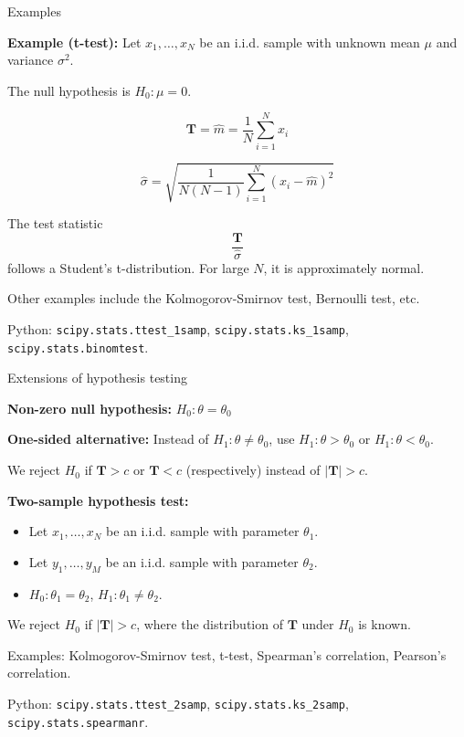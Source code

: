 \documentclass{beamer}
\begin{document}
\begin{frame}{Examples}

         \textbf{Example (t-test):} Let $x_1, \ldots, x_N$ be an i.i.d. sample with unknown mean $\mu$ and variance $\sigma^2$. 
         
         The null hypothesis is $H_0: \mu = 0$. 

        \[\mathbf{T} = \hat{m} = \frac{1}{N} \sum_{i=1}^{N} x_i\]

        \[\hat{\sigma} = \sqrt{\frac{1}{N(N-1)} \sum_{i=1}^{N} (x_i - \hat{m})^2}\]

         The test statistic 
         \[\frac{\mathbf{T}}{\hat{\sigma}}\]
         follows a Student's t-distribution. For large $N$, it is approximately normal.

        \medskip	
         
            Other examples include the Kolmogorov-Smirnov test, Bernoulli test, etc. 	   
     
            \medskip

             Python: \lstinline$scipy.stats.ttest_1samp$, \lstinline$scipy.stats.ks_1samp$, \lstinline$scipy.stats.binomtest$.

\end{frame}

\begin{frame}{Extensions of hypothesis testing}

        \textbf{Non-zero null hypothesis:} $H_0: \theta = \theta_0$

        \medskip

         \textbf{One-sided alternative:} Instead of $H_1: \theta \ne \theta_0$, use $H_1: \theta > \theta_0$ or $H_1: \theta < \theta_0$.
         
         We reject $H_0$ if $\mathbf{T} > c$ or $\mathbf{T} < c$ (respectively) instead of $|\mathbf{T}| > c$.

     \medskip
         
         \textbf{Two-sample hypothesis test:} 
         \begin{itemize}
                     \item Let $x_1, \ldots, x_N$ be an i.i.d. sample with parameter $\theta_1$.
                     \item Let $y_1, \ldots, y_M$ be an i.i.d. sample with parameter $\theta_2$.
                     \item $H_0: \theta_1 = \theta_2$, $H_1: \theta_1 \ne \theta_2$.
                    \end{itemize}			   

         We reject $H_0$ if $|\mathbf{T}| > c$, where the distribution of $\mathbf{T}$ under $H_0$ is known.

         Examples: Kolmogorov-Smirnov test, t-test, Spearman's correlation, Pearson's correlation.
                     
         Python: \lstinline$scipy.stats.ttest_2samp$, \lstinline$scipy.stats.ks_2samp$, \lstinline$scipy.stats.spearmanr$.

\end{frame}	   
\end{document}
